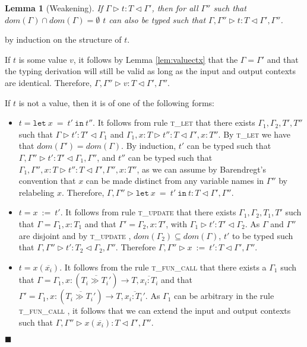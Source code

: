 \documentclass{article}
\newtheorem{lem}{Lemma}
\newcommand{\lemref}[1]{Lemma \ref{#1}}
\newcommand{\tlet}{\textsc{t\_let} }
\newcommand{\tupd}{\textsc{t\_update} }
\newcommand{\tfunc}{\textsc{t\_fun\_call} }
\newcommand{\typerule}[4]{#1 \triangleright #2 : #3 \triangleleft #4}
\newcommand{\lett}[3]{\mathtt{let}\:#1\:\mathtt{=}\:#2\:\mathtt{in}\:#3}
\newcommand{\qed}{$\blacksquare$}
\newenvironment{proof}{\vspace{1ex}\noindent{\bf Proof}\hspace{0.5em}}
  {\hfill\qed\vspace{1ex}}
\begin{document}
\begin{lem}[Weakening]
If $\typerule{\Gamma}{t}{T}{\Gamma'}$,
then for all $\Gamma''$ such that $dom(\Gamma) \cap dom(\Gamma) = \emptyset$
$t$ can also be typed such that
$\typerule{\Gamma, \Gamma''}{t}{T}{\Gamma', \Gamma''}$.
\end{lem}
\begin{proof}
by induction on the structure of $t$.

If $t$ is some value $v$, it follows by \lemref{lem:valuectx} that the 
$\Gamma = \Gamma'$ and that the typing derivation will still be valid as long
as the input and output contexts are identical. Therefore,
$\typerule{\Gamma , \Gamma''}{v}{T}{\Gamma', \Gamma''}$.

If $t$ is not a value, then it is of one of the following forms:

\begin{itemize}
\item $t = \lett{x}{t'}{t''}$. It follows from rule \tlet that
there exists $\Gamma_1, \Gamma_2, T', T''$ such that
$\typerule{\Gamma}{t'}{T'}{\Gamma_1}$ and
$\typerule{\Gamma_1, x : T}{t''}{T}{\Gamma', x : T''}$.
By \tlet we have that $dom(\Gamma') = dom(\Gamma)$.
By induction, $t'$ can be typed such
that $\typerule{\Gamma,\Gamma''}{t'}{T'}{\Gamma_1,\Gamma''}$,
and $t''$ can be typed such that
$\typerule{\Gamma_1, \Gamma'', x : T}{t''}{T}{\Gamma', \Gamma'', x : T''}$,
as we can assume by Barendregt's convention that $x$ can be made distinct from
any variable names in $\Gamma''$ by relabeling $x$.
Therefore,
$\typerule{\Gamma, \Gamma''}{\lett{x}{t'}{t}}{T}{\Gamma', \Gamma''}$.

\item $t = x\::=\:t'$. It follows from rule \tupd that
there exists $\Gamma_1, \Gamma_2, T_1, T'$ such that
$\Gamma = \Gamma_1, x : T_1$ and that
$\Gamma' = \Gamma_2, x : T'$, with
$\typerule{\Gamma_1}{t'}{T'}{\Gamma_2}$.
As $\Gamma$ and $\Gamma''$ are disjoint and by \tupd, 
$dom(\Gamma_2) \subseteq dom(\Gamma)$, $t'$ to be typed such that
$\typerule{\Gamma, \Gamma''}{t'}{T_2}{\Gamma_2, \Gamma''}$.
Therefore $\typerule{\Gamma, \Gamma''}{x\::=\:t'}{T}{\Gamma', \Gamma''}$.

\item $t = x ( \overline{x_i} )$. It follows from the rule \tfunc that
there exists a $\Gamma_1$ such that 
$\Gamma = \Gamma_1, x : (\overline{T_i \gg T_i'}) \rightarrow T, \overline{x_i : T_i}$
and that 
$\Gamma' = \Gamma_1, x : (\overline{T_i \gg T_i'}) \rightarrow T, \overline{x_i : T_i'}$.
As $\Gamma_1$ can be arbitrary in the rule \tfunc, it follows that we
can extend the input and output contexts such that
$\typerule{\Gamma, \Gamma''}{x ( \overline{x_i} )}{T}{\Gamma', \Gamma''}$.


\end{itemize}
\end{proof}
\end{document}
